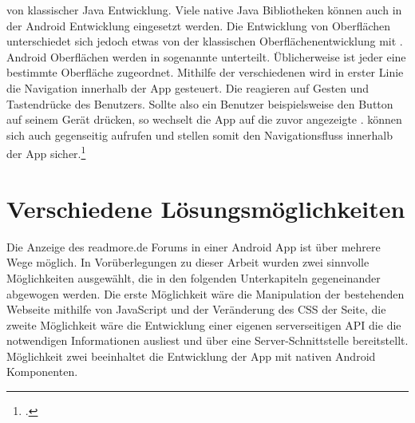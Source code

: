 von klassischer Java Entwicklung. Viele native Java Bibliotheken können auch in
der Android Entwicklung eingesetzt werden. Die Entwicklung von Oberflächen
unterschiedet sich jedoch etwas von der klassischen Oberflächenentwicklung mit
. Android Oberflächen werden in sogenannte
 unterteilt. Üblicherweise ist jeder
 eine bestimmte Oberfläche zugeordnet. Mithilfe der
verschiedenen  wird in erster Linie die Navigation
innerhalb der App gesteuert. Die  reagieren auf Gesten
und Tastendrücke des Benutzers. Sollte also ein Benutzer beispielsweise den
 Button auf seinem Gerät drücken, so wechselt die App auf
die zuvor angezeigte .  können
sich auch gegenseitig aufrufen und stellen somit
den Navigationsfluss innerhalb der App sicher.\footcite{kuenneth2012android}

\section{Verschiedene Lösungsmöglichkeiten}
Die Anzeige des readmore.de Forums in einer Android App ist über mehrere Wege
möglich. In Vorüberlegungen zu dieser Arbeit wurden zwei sinnvolle Möglichkeiten
ausgewählt, die in den folgenden Unterkapiteln gegeneinander abgewogen werden.
Die erste Möglichkeit wäre die Manipulation der bestehenden Webseite mithilfe
von JavaScript und der Veränderung des CSS der Seite, die zweite Möglichkeit
wäre die Entwicklung einer eigenen serverseitigen API die die notwendigen
Informationen ausliest und über eine Server-Schnittstelle bereitstellt.
Möglichkeit zwei beeinhaltet die Entwicklung der App mit nativen Android
Komponenten.
